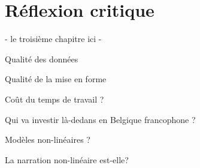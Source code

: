 
\chapter{Réflexion critique}

- le troisième chapitre ici -

Qualité des données

Qualité de la mise en forme

Coût du temps de travail ?

Qui va investir là-dedans en Belgique francophone ?

Modèles non-linéaires ?

La narration non-linéaire est-elle? 
